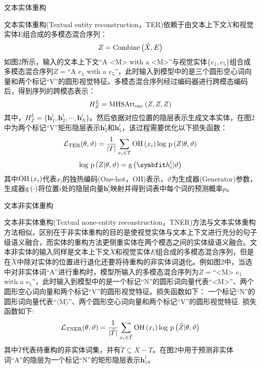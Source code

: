 {\sffamily 文本实体重构}

文本实体重构(Textual entity reconstruction，TER)依赖于由文本上下文$\tilde{X}$和视觉实体E组合成的多模态混合序列：
\begin{equation}
Z={\rm{Combine}} \left( \tilde{X}, E \right)
\end{equation}
如图2所示，输入的文本上下文“A <M> with a <M>”与视觉实体$\{e_1,e_5\}$组合成多模态混合序列$Z=$“A $e_1$ with a $e_5$”，此时输入到模型中的是三个圆形空心词向量和两个标记“V”的圆形视觉特征。多模态混合序列经过编码器进行跨模态编码后，得到序列的跨模态表示：
\begin{equation}
H_Z^L={\rm{MHSAtt_{enc}}} \left( Z, Z, Z \right)
\end{equation}
其中，$H_Z^L=\{{\boldsymbol{h}_1^l},{\boldsymbol{h}_2^l},\cdots,{\boldsymbol{h}_N^l}\}$。然后依据对应位置的隐层表示生成文本实体，在图2中为两个标记“V”矩形隐层表示${\boldsymbol{h}_2^l}$和${\boldsymbol{h}_5^l}$，该过程需要优化以下损失函数：
\begin{equation}
\mathcal{L}_{\rm{TER}} (\theta, \vartheta) =
    \frac{1}{{\vert}T{\vert}}
    \mathop{\sum}_{x_i \in T}
    {\rm{OH}} \left( x_i \right)
    {\rm log}{\ }{\rm p} \left( Z {\vert} \theta, \vartheta \right)
\end{equation}
\begin{equation}
{\log}{\ }{\rm p} \left( Z {\vert} \theta, \vartheta \right) =
    {\rm{g}} \left( {\boldsymbol h_i^l} \vert \vartheta \right)
\end{equation}
其中${\rm{OH}}\left(x_i\right)$代表$x_i$的独热编码(One-hot，OH)表示，$\vartheta$为生成器(Generator)参数，生成器${\rm{g}}\left(\cdot\right)$将位置$i$处的隐层向量${\boldsymbol{h}_i^l}$映射并得到词表中每个词的预测概率$p$。

{\sffamily 文本非实体重构}

文本非实体重构(Textual none-entity reconstruction，TNER)方法与文本实体重构方法相似，区别在于非实体重构的目的是使视觉实体与文本上下文进行充分的句子级语义融合，而实体的重构方法更侧重实体在两个模态之间的实体级语义融合。文本非实体的输入同样是文本上下文$\tilde{X}$和视觉实体$E$组合成的多模态混合序列，但是在$\tilde{X}$中除对实体的位置进行退化还要将待重构的非实体词退化。例如图2中，当选中对非实体词“A”进行重构时，模型所输入的多模态混合序列为$Z=$“<M> $e_1$ with a $e_5$”，此时输入到模型中的是一个标记“N”的圆形词向量代表“<M>”、两个圆形空心词向量和两个标记“V”的圆形视觉特征。损失函数如下：
一个标记``N''的圆形词向量代表``$\langle$M$\rangle$''、两个圆形空心词向量和两个标记``V''的圆形视觉特征. 损失函数如下:
\begin{equation}
\mathcal{L}_{\rm{TNER}}(\theta, \vartheta) =
    \frac{1}{{\vert}\tilde{T}{\vert}}
    \mathop{\sum}_{x_i \in \tilde{T}}
    {\rm{OH}} \left( x_i \right)
    {\rm log}{\ }{\rm p} \left( \tilde{Z} {\vert} \theta, \vartheta \right)
\end{equation}
其中$\tilde{T}$代表待重构的非实体词集，并有$\tilde{T}\subseteq X-T$。在图2中用于预测非实体词“A”的隐层为一个标记“N”的矩形隐层表示${\boldsymbol{h}_1^l}$。

